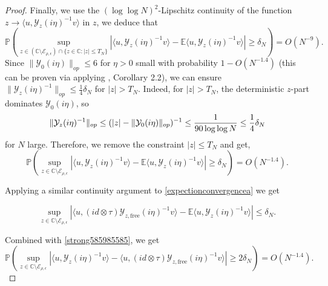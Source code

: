 \documentclass[11pt,reqno]{amsart}
\theoremstyle{plain}
\theoremstyle{remark}
\numberwithin{equation}{section}
\begin{document}
\begin{proof}
Finally, we use the $(\log\log N)^2$-Lipschitz continuity of the function $z\to \langle u,\mathcal{Y}_z(i\eta)^{-1}v\rangle$ in $z$, we deduce that 
\begin{equation}
\mathbb{P}\left( \sup_{z\in(\mathbb{C}\setminus\mathcal{E}_{\rho,\epsilon
})\cap \{z\in\mathbb{C}:|z|\leq T_N\}}\left| \langle u,
\mathcal{Y}_z(i\eta)^{-1}v\rangle -\mathbb{E}\langle u,\mathcal{Y}_z(i\eta)^{-1}v\rangle
\right|\geq \delta_N\right)= O( N^{-9}).
\end{equation}
 Since $\|\mathcal{Y}_0(i\eta)\|_{op}\leq 6$ for $\eta>0$ small with probability $1-O(N^{-1.4})$ (this can be proven via applying \cite{bandeira2023matrix}, Corollary 2.2),  we can ensure $\|{\mathcal{Y}_z(i\eta)
}^{-1}\|_{op}\leq\frac{1}{4}\delta_N$ for $|z|>T_N$. Indeed, for \(|z|>T_N\), the deterministic \(z\)-part dominates \(\mathcal{Y}_0(i\eta)\), so
\[
\|\mathcal{Y}_z(i\eta)^{-1}\|_{\rm op}
\le (|z|-\|\mathcal{Y}_0(i\eta)\|_{\rm op})^{-1}
\le \frac{1}{90\log\log N}
\le \frac14\delta_N
\]
for \(N\) large. Therefore, we remove the constraint $|z|\leq T_N$ and get,
\begin{equation}\label{strong585985585}
\mathbb{P}\left( \sup_{z\in\mathbb{C}\setminus\mathcal{E}_{\rho,\epsilon
}}\left| \langle u,
\mathcal{Y}_z(i\eta)^{-1}v\rangle -\mathbb{E}\langle u,\mathcal{Y}_z(i\eta)^{-1}v\rangle
\right|\geq \delta_N\right)= O( N^{-1.4}).
\end{equation}

Applying a similar continuity argument to \eqref{expectionconvergencea} we get 

\begin{equation}
 \sup_{z\in\mathbb{C}\setminus\mathcal{E}_{\rho,\epsilon
}}\left| \langle u,(id\otimes\tau)\mathcal{Y}_{z,\text{free}}(i\eta)^{-1}
v\rangle -\mathbb{E}\langle u,\mathcal{Y}_z(i\eta)^{-1}v\rangle
\right|\leq \delta_N.
\end{equation}


Combined with \eqref{strong585985585}, we get 
\begin{equation}\label{agagagagagagaggaaagg}
\mathbb{P}\left( \sup_{z\in\mathbb{C}\setminus\mathcal{E}_{\rho,\epsilon
}}\left| \langle u,
\mathcal{Y}_z(i\eta)^{-1}v\rangle -\langle u,(id\otimes\tau)\mathcal{Y}_{z,\text{free}}(i\eta)^{-1}
v\rangle
\right|\geq 2\delta_N\right)= O( N^{-1.4}).
\end{equation}




\end{proof}
\end{document}
